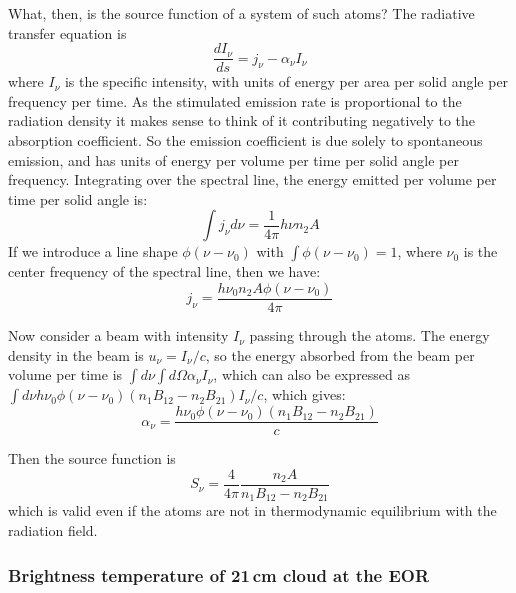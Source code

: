 What, then, is the source function of a system of such atoms? The radiative transfer equation is
\begin{equation}
\frac{dI_\nu}{ds}=j_\nu-\alpha_\nu I_\nu
\end{equation}
where $I_\nu$ is the specific intensity, with units of energy per area per solid angle per frequency per time. As the stimulated emission rate is proportional to the radiation density it makes sense to think of it contributing negatively to the absorption coefficient. So the emission coefficient is due solely to spontaneous emission, and has units of energy per volume per time per solid angle per frequency. Integrating over the spectral line, the energy emitted per volume per time per solid angle is:
\begin{equation}
\int j_\nu d\nu=\frac{1}{4\pi}h\nu n_2 A
\end{equation}
If we introduce a line shape $\phi(\nu-\nu_0)$ with $\int\phi(\nu-\nu_0)=1$, where $\nu_0$ is the center frequency of the spectral line, then we have:
\begin{equation}
\boxed{j_\nu=\frac{h\nu_0 n_2A\phi(\nu-\nu_0)}{4\pi}}
\end{equation}

Now consider a beam with intensity $I_\nu$ passing through the atoms. The energy density in the beam is $u_\nu=I_\nu/c$, so the energy absorbed from the beam per volume per time is $\int d\nu\int d\Omega\alpha_\nu I_\nu$, which can also be expressed as $\int d\nu h\nu_0\phi(\nu-\nu_0)(n_1B_{12}-n_2B_{21})I_\nu/c$, which gives:
\begin{equation}
\boxed{\alpha_\nu=\frac{h\nu_0\phi(\nu-\nu_0)(n_1B_{12}-n_2B_{21})}{c}}
\end{equation}

Then the source function is
\begin{equation}
\boxed{S_\nu=\frac{4}{4\pi}\frac{ n_2A}{n_1B_{12}-n_2B_{21}}}
\end{equation}
which is valid even if the atoms are not in thermodynamic equilibrium with the radiation field. 

\subsubsection{Brightness temperature of 21\,cm cloud at the EOR}

